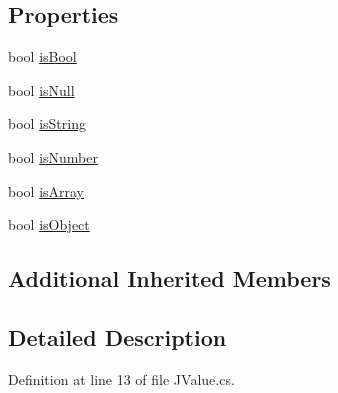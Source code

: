 \subsection*{Properties}
\begin{DoxyCompactItemize}
\item 
bool \hyperlink{class_disruptive_software_1_1_j_value_a9fc87ea409092d44e0751810c8cc5d56}{is\+Bool}
\item 
bool \hyperlink{class_disruptive_software_1_1_j_value_a0655a428d88bd7447a6a6472765bf9a6}{is\+Null}
\item 
bool \hyperlink{class_disruptive_software_1_1_j_value_a0b90970ea57c7640138d7c4d8d23566c}{is\+String}
\item 
bool \hyperlink{class_disruptive_software_1_1_j_value_a224d2489aea8ffc065178f0d427128c8}{is\+Number}
\item 
bool \hyperlink{class_disruptive_software_1_1_j_value_ad3f174641df11f27b5a55af2648514d8}{is\+Array}
\item 
bool \hyperlink{class_disruptive_software_1_1_j_value_a27b4b9ce3e878a99538aac974d65f00d}{is\+Object}
\end{DoxyCompactItemize}
\subsection*{Additional Inherited Members}


\subsection{Detailed Description}


Definition at line 13 of file J\+Value.\+cs.



